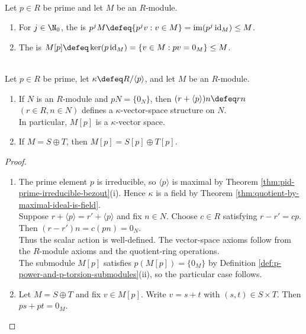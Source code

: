 \begin{definition} \label{def:p-power-and-p-torsion-submodules} \\
Let $p\in R$ be prime and let $M$ be an $R$-module.
\begin{enumerate}[label=(\roman*)]
\setlength{\itemsep}{0pt}
\item For $j\in\N_0$, the  is $p^jM\defeq\{p^jv:v\in M\}=\operatorname{im}(p^j\operatorname{id}_M)\leq M$.
\item The  is $M[p]\defeq\ker(p\operatorname{id}_M)=\{v\in M:pv=0_M\}\leq M$.
\end{enumerate}
\end{definition}

\begin{lemma} \label{lem:p-torsion-layer-vector-space} \\
Let $p\in R$ be prime, let $\kappa\defeq R/\langle p\rangle$, and let $M$ be an $R$-module.
\begin{enumerate}[label=(\roman*)]
\setlength{\itemsep}{0pt}
\item If $N$ is an $R$-module and $pN=\{0_N\}$, then $(r+\langle p\rangle)n\defeq rn$ $(r\in R,n\in N)$ defines a $\kappa$-vector-space structure on $N$.\\
In particular, $M[p]$ is a $\kappa$-vector space.
\item If $M=S\oplus T$, then $M[p]=S[p]\oplus T[p]$.
\end{enumerate}
\begin{proof}
\begin{enumerate}[label=(\roman*)]
\setlength{\itemsep}{0pt}
\item The prime element $p$ is irreducible, so $\langle p\rangle$ is maximal by Theorem \ref{thm:pid-prime-irreducible-bezout}(i). Hence $\kappa$ is a field by Theorem \ref{thm:quotient-by-maximal-ideal-is-field}.\\
Suppose $r+\langle p\rangle=r'+\langle p\rangle$ and fix $n\in N$. Choose $c\in R$ satisfying $r-r'=cp$. Then $(r-r')n=c(pn)=0_N$.\\
Thus the scalar action is well-defined. The vector-space axioms follow from the $R$-module axioms and the quotient-ring operations.\\
The submodule $M[p]$ satisfies $p(M[p])=\{0_M\}$ by Definition \ref{def:p-power-and-p-torsion-submodules}(ii), so the particular case follows.
\item Let $M=S\oplus T$ and fix $v\in M[p]$. Write $v=s+t$ with $(s,t)\in S\times T$. Then $ps+pt=0_M$.\\

\end{enumerate}
\end{proof}
\end{lemma}
